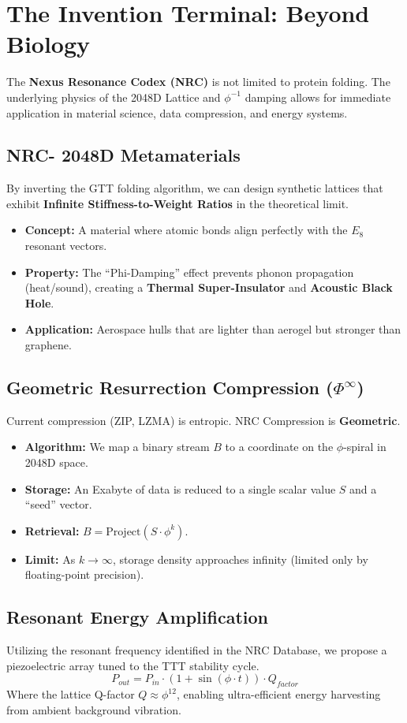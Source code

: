 \documentclass[11pt,a4paper,oneside]{article}
\begin{document}
	\section{The Invention Terminal: Beyond Biology}

	The \textbf{Nexus Resonance Codex (NRC)} is not limited to protein folding. The underlying physics of the 2048D Lattice and \(\phi^{-1}\) damping allows for immediate application in material science, data compression, and energy systems.

	\subsection{NRC- 2048D Metamaterials}
	By inverting the GTT folding algorithm, we can design synthetic lattices that exhibit \textbf{Infinite Stiffness-to-Weight Ratios} in the theoretical limit.
	\begin{itemize}
		\item \textbf{Concept:} A material where atomic bonds align perfectly with the \(E_8\) resonant vectors.
		\item \textbf{Property:} The ``Phi-Damping'' effect prevents phonon propagation (heat/sound), creating a \textbf{Thermal Super-Insulator} and \textbf{Acoustic Black Hole}.
		\item \textbf{Application:} Aerospace hulls that are lighter than aerogel but stronger than graphene.
	\end{itemize}

	\subsection{Geometric Resurrection Compression (\(\Phi^\infty\))}
	Current compression (ZIP, LZMA) is entropic. NRC Compression is \textbf{Geometric}.
	\begin{itemize}
		\item \textbf{Algorithm:} We map a binary stream \(B\) to a coordinate on the \(\phi\)-spiral in 2048D space.
		\item \textbf{Storage:} An Exabyte of data is reduced to a single scalar value \(S\) and a ``seed'' vector.
		\item \textbf{Retrieval:} \(B = \text{Project}(S \cdot \phi^k)\).
		\item \textbf{Limit:} As \(k \to \infty\), storage density approaches infinity (limited only by floating-point precision).
	\end{itemize}

	\subsection{Resonant Energy Amplification}
	Utilizing the resonant frequency identified in the NRC Database, we propose a piezoelectric array tuned to the TTT stability cycle.
	\begin{equation}
		P_{out} = P_{in} \cdot (1 + \sin(\phi \cdot t)) \cdot Q_{factor}
	\end{equation}
	Where the lattice Q-factor \(Q \approx \phi^{12}\), enabling ultra-efficient energy harvesting from ambient background vibration.
\end{document}
